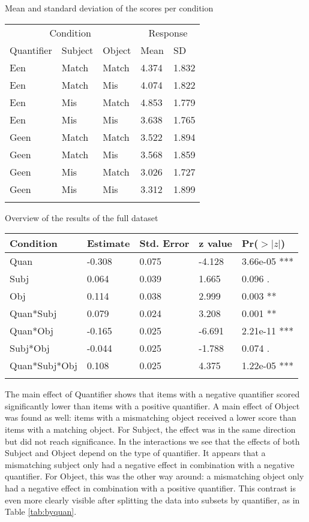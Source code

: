 \documentclass[11pt]{article} %
\begin{document}
\begin{threeparttable}
\caption{\label{tab:descriptives}Mean and standard deviation of the scores per condition}
\begin{tabular}{lll|ll}
	\multicolumn{3}{c}{Condition} & \multicolumn{2}{c}{Response} \\
	Quantifier & Subject & Object & Mean & SD \\
	\hline
	Een & Match & Match & 4.374 & 1.832\\
	Een & Match & Mis & 4.074 & 1.822  \\
	Een & Mis & Match & 4.853 & 1.779  \\
	Een & Mis & Mis & 3.638 & 1.765 \\
	Geen & Match & Match & 3.522 & 1.894  \\
	Geen & Match & Mis &  3.568 & 1.859  \\
	Geen & Mis & Match &  3.026 & 1.727  \\
	Geen & Mis & Mis & 3.312 & 1.899   \\\\
	\end{tabular}
\end{threeparttable}



\begin{threeparttable}
\caption{\label{tab:fullmodel}Overview of the results of the full dataset}
\begin{tabular}{lllll}
	Condition & Estimate & Std. Error & z value & Pr($>|z|$) \\
	\hline
Quan       &             -0.308   & 0.075 & -4.128& 3.66e-05 ***\\
Subj        &            0.064  &  0.039 & 1.665 & 0.096 .  \\
Obj         &            0.114  &  0.038 & 2.999&  0.003 ** \\
Quan*Subj &          0.079  &  0.024 & 3.208 & 0.001 ** \\
Quan*Obj  &          -0.165  &  0.025  & -6.691 &2.21e-11 ***\\
Subj*Obj   &        -0.044  &  0.025 & -1.788  &0.074 .  \\
Quan*Subj*Obj &  0.108  &  0.025 &  4.375& 1.22e-05 ***\\\\
\end{tabular}
\end{threeparttable}


The main effect of Quantifier shows that items with a negative quantifier scored significantly lower than items with a positive quantifier. A main effect of Object was found as well: items with a mismatching object received a lower score than items with a matching object. For Subject, the effect was in the same direction but did not reach significance. In the interactions we see that the effects of both Subject and Object depend on the type of quantifier. It appears that a mismatching subject only had a negative effect in combination with a negative quantifier. For Object, this was the other way around: a mismatching object only had a negative effect in combination with a positive quantifier. This contrast is even more clearly visible after splitting the data into subsets by quantifier, as in Table \ref{tab:byquan}. 
\end{document}
